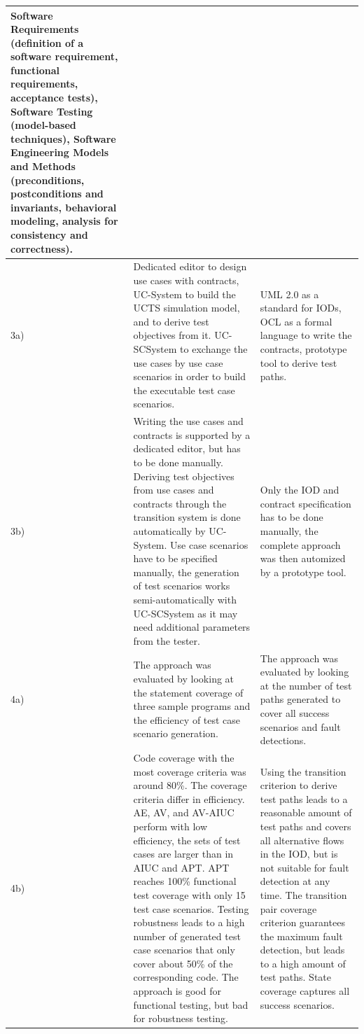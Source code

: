 \begin{small}
\begin{longtable}[h]{p{0.45cm}|p{}|p{}}
	Software Requirements (definition of a software requirement, functional requirements, acceptance tests), Software Testing (model-based techniques), Software Engineering Models and Methods (preconditions, postconditions and invariants, behavioral modeling, analysis for consistency and correctness). \\
	\hline
	3a) & 
	Dedicated editor to design use cases with contracts, UC-System to build the UCTS simulation model, and to derive test objectives from it. UC-SCSystem to exchange the use cases by use case scenarios in order to build the executable test case scenarios. & 
	UML 2.0 as a standard for IODs, OCL as a formal language to write the contracts, prototype tool to derive test paths. \\
	\hline
	3b) & 
	Writing the use cases and contracts is supported by a dedicated editor, but has to be done manually. Deriving test objectives from use cases and contracts through the transition system is done automatically by UC-System. Use case scenarios have to be specified manually, the generation of test scenarios works semi-automatically with UC-SCSystem as it may need additional parameters from the tester. & 
	Only the IOD and contract specification has to be done manually, the complete approach was then automized by a prototype tool. \\
	\hline
	4a) & 
	The approach was evaluated by looking at the statement coverage of three sample programs and the efficiency of test case scenario generation. & 
	The approach was evaluated by looking at the number of test paths generated to cover all success scenarios and fault detections. \\
	\hline
	4b) &
	Code coverage with the most coverage criteria was around 80\%. The coverage criteria differ in efficiency. AE, AV, and AV-AIUC perform with low efficiency, the sets of test cases are larger than in AIUC and APT. APT reaches 100\% functional test coverage with only 15 test case scenarios. Testing robustness leads to a high number of generated test case scenarios that only cover about 50\% of the corresponding code. The approach is good for functional testing, but bad for robustness testing. &
	Using the transition criterion to derive test paths leads to a reasonable amount of test paths and covers all alternative flows in the IOD, but is not suitable for fault detection at any time. The transition pair coverage criterion guarantees the maximum fault detection, but leads to a high amount of test paths. State coverage captures all success scenarios. \\
	\hline
\end{longtable}
\end{small}


